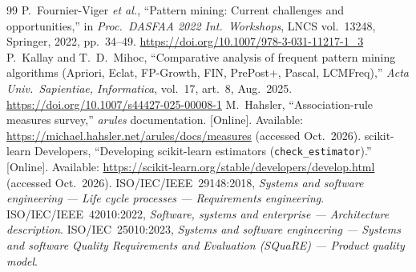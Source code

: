 \begin{thebibliography}{99}
 P.~Fournier-Viger \emph{et al.}, ``Pattern mining: Current challenges and opportunities,'' in \emph{Proc.\ DASFAA 2022 Int.\ Workshops}, LNCS vol.~13248, Springer, 2022, pp.~34--49. \url{https://doi.org/10.1007/978-3-031-11217-1_3}
 P.~Kallay and T.~D.~Mihoc, ``Comparative analysis of frequent pattern mining algorithms (Apriori, Eclat, FP-Growth, FIN, PrePost+, Pascal, LCMFreq),'' \emph{Acta Univ.\ Sapientiae, Informatica}, vol.~17, art.~8, Aug.~2025. \url{https://doi.org/10.1007/s44427-025-00008-1}
 M.~Hahsler, ``Association-rule measures survey,'' \emph{arules} documentation. [Online]. Available: \url{https://michael.hahsler.net/arules/docs/measures} (accessed Oct.~2026).
 scikit-learn Developers, ``Developing scikit-learn estimators (\texttt{check\_\protect\allowbreak{}estimator}).'' [Online]. Available: \url{https://scikit-learn.org/stable/developers/develop.html} (accessed Oct.~2026).
 ISO/IEC/IEEE~29148:2018, \emph{Systems and software engineering --- Life cycle processes --- Requirements engineering}.
 ISO/IEC/IEEE~42010:2022, \emph{Software, systems and enterprise --- Architecture description}.
 ISO/IEC~25010:2023, \emph{Systems and software engineering --- Systems and software Quality Requirements and Evaluation (SQuaRE) --- Product quality model}.
\end{thebibliography}
\endgroup
